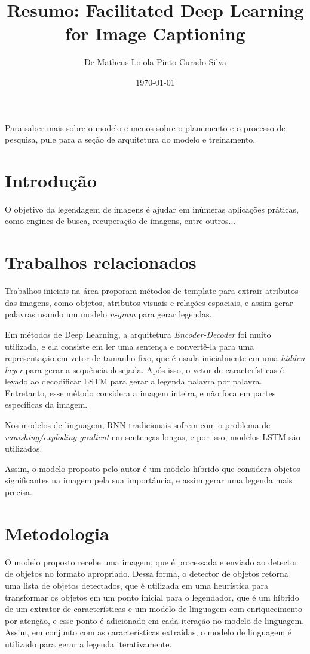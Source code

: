 \documentclass[12pt]{article}
\title{Resumo: Facilitated Deep Learning for Image Captioning}
\author{De Matheus Loiola Pinto Curado Silva}
\date{\today}
\begin{document}
	
\maketitle

Para saber mais sobre o modelo e menos sobre o planemento e o processo de pesquisa, pule para a seção de arquitetura do modelo e treinamento.

\section*{Introdução}

O objetivo da legendagem de imagens é ajudar em inúmeras aplicações práticas, como engines de busca, recuperação de imagens, entre outros...

\section*{Trabalhos relacionados}

Trabalhos iniciais na área proporam métodos de template para extrair atributos das imagens, como objetos, atributos visuais e relações espaciais, e assim gerar palavras usando um modelo \textit{n-gram} para gerar legendas.

Em métodos de Deep Learning, a arquitetura \textit{Encoder-Decoder} foi muito utilizada, e ela consiste em ler uma sentença e convertê-la para uma representação em vetor de tamanho fixo, que é usada inicialmente em uma \textit{hidden layer} para gerar a sequência desejada. Após isso, o vetor de características é levado ao decodificar LSTM para gerar a legenda palavra por palavra. Entretanto, esse método considera a imagem inteira, e não foca em partes específicas da imagem.

Nos modelos de linguagem, RNN tradicionais sofrem com o problema de \textit{vanishing/exploding gradient} em sentenças longas, e por isso, modelos LSTM são utilizados. 

Assim, o modelo proposto pelo autor é um modelo híbrido que considera objetos significantes na imagem pela sua importância, e assim gerar uma legenda mais precisa.

\section*{Metodologia}

O modelo proposto recebe uma imagem, que é processada e enviado ao detector de objetos no formato apropriado. Dessa forma, o detector de objetos retorna uma lista de objetos detectados, que é utilizada em uma heurística para transformar os objetos em um ponto inicial para o legendador, que é um híbrido de um extrator de características e um modelo de linguagem com enriquecimento por atenção, e esse ponto é adicionado em cada iteração no modelo de linguagem. Assim, em conjunto com as características extraídas, o modelo de linguagem é utilizado para gerar a legenda iterativamente.
\end{document}
